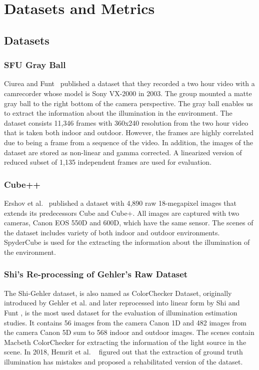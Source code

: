 \chapter{Datasets and Metrics}
\label{chp:datasets_and_metrics}

\section{Datasets}

\subsection{SFU Gray Ball}

Ciurea and Funt~\cite{sfuGrayBall} published a dataset that they recorded a two hour video with a camrecorder whose model is Sony VX-2000 in 2003. The group mounted a matte gray ball to the right bottom of the camera perspective. The gray ball enables us to extract the information about the illumination in the environment. The dataset consists 11,346 frames with 360x240 resolution from the two hour video that is taken both indoor and outdoor. However, the frames are highly correlated due to being a frame from a sequence of the video. In addition, the images of the dataset are stored as non-linear and gamma corrected. A linearized version of reduced subset of 1,135 independent frames are used for evaluation.

\subsection{Cube++}

Ershov et al.~\cite{ershov2020cube} published a dataset with 4,890 raw 18-megapixel images that extends its predecessors Cube and Cube+. All images are captured with two cameras, Canon EOS 550D and 600D, which have the same sensor. The scenes of the dataset includes variety of both indoor and outdoor environments. SpyderCube is used for the extracting the information about the illumination of the environment.

\subsection{Shi's Re-processing of Gehler's Raw Dataset }

The Shi-Gehler dataset, is also named as ColorChecker Dataset, originally introduced by Gehler et al. \cite{gehler2008bayesian} and later reprocessed into linear form by Shi and Funt \cite{shi2010reprocessed}, is the most used dataset for the evaluation of illumination estimation studies. It contains 56 images from the camera Canon 1D and 482 images from the camera Canon 5D sum to 568 indoor and outdoor images. The scenes contain Macbeth ColorChecker for extracting the information of the light source in the scene. In 2018, Hemrit et al. ~\cite{Hemrit2018ColorCheckerError} figured out that the extraction of ground truth illumination has mistakes and proposed a rehabilitated version of the dataset.

